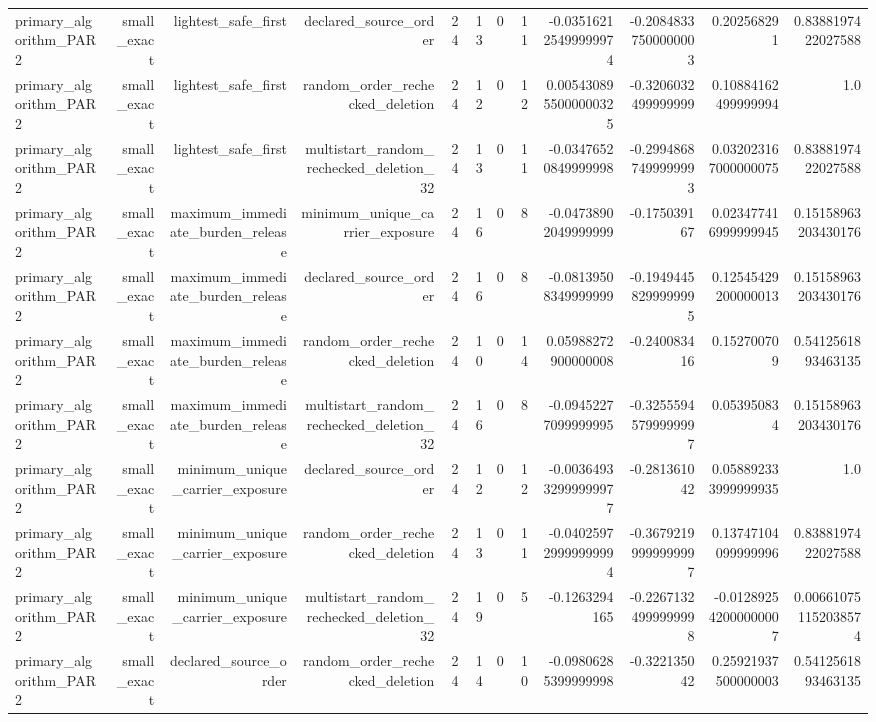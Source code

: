 {\begin{longtable}{lrrrrrrrrrrr}
primary\_algorithm\_PAR2 & small\_exact & lightest\_safe\_first & declared\_source\_order & 24 & 13 & 0 & 11 & -0.035162125499999974 & -0.20848337500000003 & 0.202568291 & 0.8388197422027588 \\
primary\_algorithm\_PAR2 & small\_exact & lightest\_safe\_first & random\_order\_rechecked\_deletion & 24 & 12 & 0 & 12 & 0.0054308955000000325 & -0.3206032499999999 & 0.10884162499999994 & 1.0 \\
primary\_algorithm\_PAR2 & small\_exact & lightest\_safe\_first & multistart\_random\_rechecked\_deletion\_32 & 24 & 13 & 0 & 11 & -0.03476520849999998 & -0.29948687499999993 & 0.032023167000000075 & 0.8388197422027588 \\
primary\_algorithm\_PAR2 & small\_exact & maximum\_immediate\_burden\_release & minimum\_unique\_carrier\_exposure & 24 & 16 & 0 & 8 & -0.04738902049999999 & -0.175039167 & 0.023477416999999945 & 0.15158963203430176 \\
primary\_algorithm\_PAR2 & small\_exact & maximum\_immediate\_burden\_release & declared\_source\_order & 24 & 16 & 0 & 8 & -0.08139508349999999 & -0.19494458299999995 & 0.12545429200000013 & 0.15158963203430176 \\
primary\_algorithm\_PAR2 & small\_exact & maximum\_immediate\_burden\_release & random\_order\_rechecked\_deletion & 24 & 10 & 0 & 14 & 0.05988272900000008 & -0.240083416 & 0.152700709 & 0.5412561893463135 \\
primary\_algorithm\_PAR2 & small\_exact & maximum\_immediate\_burden\_release & multistart\_random\_rechecked\_deletion\_32 & 24 & 16 & 0 & 8 & -0.09452277099999995 & -0.32555945799999997 & 0.053950834 & 0.15158963203430176 \\
primary\_algorithm\_PAR2 & small\_exact & minimum\_unique\_carrier\_exposure & declared\_source\_order & 24 & 12 & 0 & 12 & -0.003649332999999977 & -0.281361042 & 0.058892333999999935 & 1.0 \\
primary\_algorithm\_PAR2 & small\_exact & minimum\_unique\_carrier\_exposure & random\_order\_rechecked\_deletion & 24 & 13 & 0 & 11 & -0.040259729999999994 & -0.36792199999999997 & 0.13747104099999996 & 0.8388197422027588 \\
primary\_algorithm\_PAR2 & small\_exact & minimum\_unique\_carrier\_exposure & multistart\_random\_rechecked\_deletion\_32 & 24 & 19 & 0 & 5 & -0.1263294165 & -0.22671324999999998 & -0.012892542000000007 & 0.006610751152038574 \\
primary\_algorithm\_PAR2 & small\_exact & declared\_source\_order & random\_order\_rechecked\_deletion & 24 & 14 & 0 & 10 & -0.09806285399999998 & -0.322135042 & 0.25921937500000003 & 0.5412561893463135 \\

\end{longtable}}
